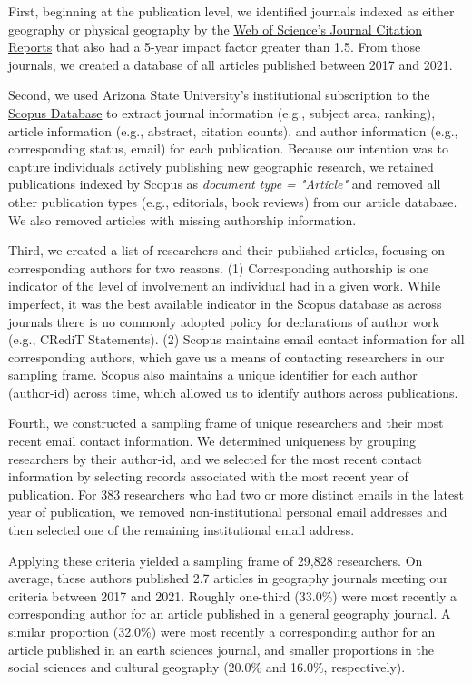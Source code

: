 \documentclass[]{interact}
\theoremstyle{plain}%
\theoremstyle{definition}
\theoremstyle{remark}
\begin{document}
First, beginning at the publication level, we identified journals indexed as either geography or physical geography by the \href{https://access.clarivate.com/}{Web of Science's Journal Citation Reports} that also had a 5-year impact factor greater than 1.5.
From those journals, we created a database of all articles published between 2017 and 2021.  

Second, we used Arizona State University's institutional subscription to the \href{https://www.scopus.com/home.uri}{Scopus Database} to extract journal information (e.g., subject area, ranking), article information (e.g., abstract, citation counts), and author information (e.g., corresponding status, email) for each publication. 
Because our intention was to capture individuals actively publishing new geographic research, we retained publications indexed by Scopus as \textit{document type = "Article"} and removed all other publication types (e.g., editorials, book reviews) from our article database. 
We also removed articles with missing authorship information. 

Third, we created a list of researchers and their published articles, focusing on corresponding authors for two reasons.
(1) Corresponding authorship is one indicator of the level of involvement an individual had in a given work. 
While imperfect, it was the best available indicator in the Scopus database as across journals there is no commonly adopted policy for declarations of author work (e.g., CRediT Statements).
(2) Scopus maintains email contact information for all corresponding authors, which gave us a means of contacting researchers in our sampling frame.
Scopus also maintains a unique identifier for each author (author-id) across time, which allowed us to identify authors across publications. 

Fourth, we constructed a sampling frame of unique researchers and their most recent email contact information. 
We determined uniqueness by grouping researchers by their author-id, and we selected for the most recent contact information by selecting records associated with the most recent year of publication. 
For 383 researchers who had two or more distinct emails in the latest year of publication, we removed non-institutional personal email addresses and then selected one of the remaining institutional email address.

Applying these criteria yielded a sampling frame of 29,828 researchers. 
On average, these authors published 2.7 articles in geography journals meeting our criteria between 2017 and 2021. 
Roughly one-third (33.0\%) were most recently a corresponding author for an article published in a general geography journal. 
A similar proportion (32.0\%) were most recently a corresponding author for an article published in an earth sciences journal, and smaller proportions in the social sciences and cultural geography (20.0\% and 16.0\%, respectively).
\end{document}
